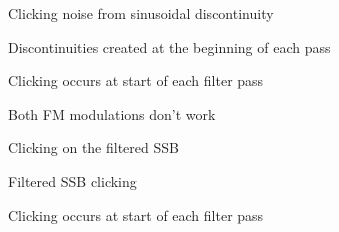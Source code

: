 
\begin{DoxyRefList}
\item[\label{bug__bug000001}%
\hypertarget{bug__bug000001}{}%
File \hyperlink{alsa__test_8cpp}{alsa\+\_\+test.cpp} ]Clicking noise from sinusoidal discontinuity  
\item[\label{bug__bug000002}%
\hypertarget{bug__bug000002}{}%
File \hyperlink{Filter_8hpp}{Filter.hpp} ]Discontinuities created at the beginning of each pass  
\item[\label{bug__bug000003}%
\hypertarget{bug__bug000003}{}%
File \hyperlink{lsb__filter__test_8cpp}{lsb\+\_\+filter\+\_\+test.cpp} ]Clicking occurs at start of each filter pass  
\item[\label{bug__bug000004}%
\hypertarget{bug__bug000004}{}%
File \hyperlink{Modulator_8hpp}{Modulator.hpp} ]Both F\+M modulations don't work 

Clicking on the filtered S\+S\+B  
\item[\label{bug__bug000005}%
\hypertarget{bug__bug000005}{}%
File \hyperlink{modulator__test_8cpp}{modulator\+\_\+test.cpp} ]Filtered S\+S\+B clicking  
\item[\label{bug__bug000006}%
\hypertarget{bug__bug000006}{}%
File \hyperlink{usb__filter__test_8cpp}{usb\+\_\+filter\+\_\+test.cpp} ]Clicking occurs at start of each filter pass 
\end{DoxyRefList}